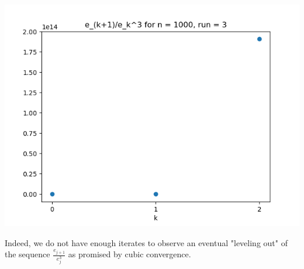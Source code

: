 \documentclass{article}
\begin{document}
\begin{enumerate}
\begin{enumerate}
\begin{center}
			\includegraphics[scale=.4]{hw4 err n = 1000 run = 3}
		\end{center}
		Indeed, we do not have enough iterates to observe an eventual "leveling out" of the sequence $\frac{e_{j+1}}{e_j^3}$ as promised by cubic convergence.
		
		
		
		
	\end{enumerate}
	
	
	
\end{enumerate}
	
	
\end{document}
